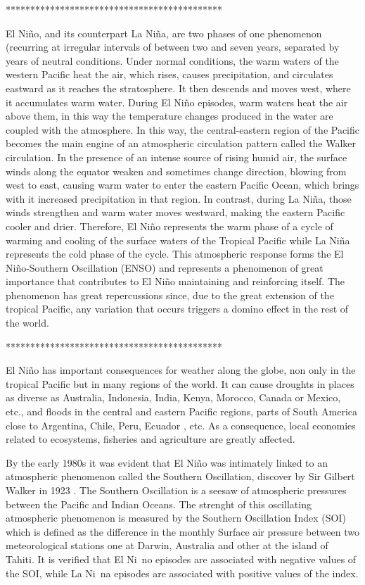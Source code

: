 \documentclass[onecolumn, preprint,aps,amsmath, amssymb, superscriptaddress]{revtex4}
\begin{document}
********************************************

El Niño, and its counterpart La Niña, are two phases of one phenomenon (recurring at irregular intervals of between two and seven years, separated by years of neutral conditions.
Under normal conditions, the warm waters of the western Pacific heat the air, which rises, causes precipitation, and circulates eastward as it reaches the stratosphere. It then descends and moves west, where it accumulates warm water.
 During El Niño episodes, warm waters heat the air above them, in this way the temperature changes produced in the water are coupled with the atmosphere. In this way, the central-eastern region of the Pacific becomes the main engine of an atmospheric circulation pattern called the Walker circulation.
In the presence of an intense source of rising humid air, the surface winds along the equator weaken and sometimes change direction, blowing from west to east, causing warm water to enter the eastern Pacific Ocean, which brings with it increased precipitation in that region.
In contrast, during La Niña, those winds strengthen and warm water moves westward, making the eastern Pacific cooler and drier. Therefore, El Niño represents the warm phase of a cycle of warming and cooling of the surface waters of the Tropical Pacific while La Niña represents the cold phase of the cycle.
 This atmospheric response forms the El Niño-Southern Oscillation (ENSO) and represents a phenomenon of great importance that contributes to El Niño maintaining and reinforcing itself.
The phenomenon has great repercussions since, due to the great extension of the tropical Pacific, any variation that occurs triggers a domino effect in the rest of the world.

********************************************


El Niño has important consequences for weather along the globe, non only in the tropical Pacific but in many regions of the world. It can cause droughts in places as diverse as Australia, Indonesia, India, Kenya, Morocco, Canada or Mexico, etc., and floods in the central and eastern Pacific regions, parts of South America close to Argentina, Chile, Peru, Ecuador , etc. As a consequence, local economies related to ecosystems, fisheries and agriculture are greatly affected.

By the early 1980s it was evident that El Niño was intimately linked to an atmospheric phenomenon called the Southern Oscillation, discover by Sir Gilbert Walker in 1923 \cite{Walker}. The Southern Oscillation is a seesaw of atmospheric pressures between the Pacific and Indian Oceans. The strenght of this oscillating atmospheric phenomenon is measured by the Southern Oscillation Index (SOI) which is defined as the difference in the monthly Surface air pressure between two meteorological stations one at Darwin, Australia and other at the island of Tahiti. It is verified that El Ni~no episodes are associated with negative values of the SOI, while La Ni~na episodes are associated with positive values of the index.
\end{document}
